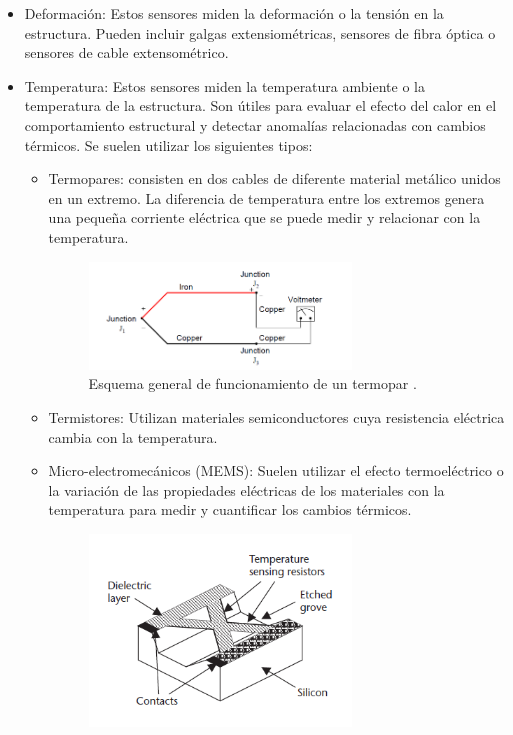     \begin{itemize}
        \item Deformación: Estos sensores miden la deformación o la tensión en la estructura. Pueden incluir galgas extensiométricas, sensores de fibra óptica o sensores de cable extensométrico.
        \item Temperatura:  Estos sensores miden la temperatura ambiente o la temperatura de la estructura. Son útiles para evaluar el efecto del calor en el comportamiento estructural y detectar anomalías relacionadas con cambios térmicos. Se suelen utilizar los siguientes tipos:
        \begin{itemize}
            \item Termopares: consisten en dos cables de diferente material metálico unidos en un extremo. La diferencia de temperatura entre los extremos genera una pequeña corriente eléctrica que se puede medir y relacionar con la temperatura.
             \begin{figure}[H]
                \centering
                \includegraphics[width = 0.7\textwidth]{imagenes/cap1_marcoteo/termocupla-con-voltimetro.png}
                \caption{Esquema general de funcionamiento de un termopar \citep{dunn2005introduction}.}
                \label{fig:termopar}
            \end{figure}
            \item Termistores: Utilizan materiales semiconductores cuya resistencia eléctrica cambia con la temperatura. 
            \item Micro-electromecánicos (MEMS): Suelen utilizar el efecto termoeléctrico o la variación de las propiedades eléctricas de los materiales con la temperatura para medir y cuantificar los cambios térmicos.
            \begin{figure}[H]
                \centering
                \includegraphics[width = 0.7\textwidth]{imagenes/cap1_marcoteo/TempMEMS.png}

\end{figure}
\end{itemize}
\end{itemize}
